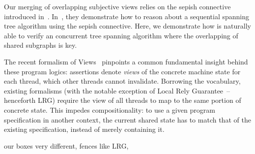Our merging of overlapping subjective views relies on the
sepish connective introduced in~\cite{reynolds,gareth,jules}. 
In~\cite{jules}, they demonstrate how to reason about a sequential
spanning tree algorithm using the sepish connective. Here, we
demonstrate
how \colosl is naturally able to verify an concurrent tree spanning
algorithm where the 
overlapping of shared subgraphs is key. 




The recent formalism of Views~\cite{views} pinpoints a common
fundamental insight behind these program logics: assertions denote
\emph{views} of the concrete machine state for each thread, which
other threads cannot invalidate. Borrowing the vocabulary, existing
formalisms (with the notable exception of Local Rely
Guarantee~\cite{lrg}--henceforth LRG) require the view of all threads
to map to the same portion of concrete state. This impedes
compositionality: to use a given program specification in another
context, the current shared state has to match that of the existing
specification, instead of merely containing it. 

our boxes very different,  fences like LRG, 




